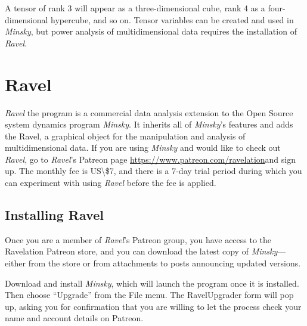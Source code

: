A tensor of rank 3 will appear as a three-dimensional cube, rank 4
as a four-dimensional hypercube, and so on. Tensor variables can be
created and used in \emph{Minsky}, but power analysis of multidimensional
data requires the installation of \emph{Ravel}.

\section{Ravel}

\label{Ravel}\emph{Ravel} the program is a commercial data analysis
extension to the Open Source system dynamics program \emph{Minsky}.
It inherits all of \emph{Minsky}'s features and adds the Ravel\texttrademark \textcircledP ,
a graphical object for the manipulation and analysis of multidimensional
data. If you are using \emph{Minsky} and would like to check out \emph{Ravel},
go to \emph{Ravel}'s Patreon page \url{https://www.patreon.com/ravelation}and
sign up. The monthly fee is US\textbackslash\$7, and there is a
7-day trial period during which you can experiment with using \emph{Ravel}
before the fee is applied.

\subsection{Installing Ravel}

Once you are a member of \emph{Ravel}'s Patreon group, you have access
to the Ravelation Patreon store, and you can download the latest copy
of \emph{Minsky}---either from the store or from attachments to posts
announcing updated versions.

Download and install \emph{Minsky}, which will launch the program
once it is installed. Then choose ``Upgrade'' from the File menu.
The RavelUpgrader form will pop up, asking you for confirmation that
you are willing to let the process check your name and account details
on Patreon.

